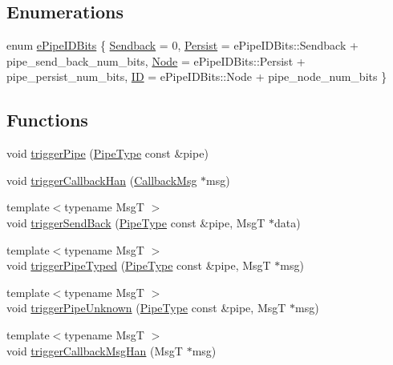 \subsection*{Enumerations}
\begin{DoxyCompactItemize}
\item 
enum \hyperlink{namespacevt_1_1pipe_a21eef17afd7b326e3b65894dffa25901}{e\+Pipe\+I\+D\+Bits} \{ \hyperlink{namespacevt_1_1pipe_a21eef17afd7b326e3b65894dffa25901aaac42b3fdd37e9218dbd0e436d89267d}{Sendback} = 0, 
\hyperlink{namespacevt_1_1pipe_a21eef17afd7b326e3b65894dffa25901ac18837aff5b91489fb6ecd1d654c9fe6}{Persist} = e\+Pipe\+I\+D\+Bits\+:\+:Sendback + pipe\+\_\+send\+\_\+back\+\_\+num\+\_\+bits, 
\hyperlink{namespacevt_1_1pipe_a21eef17afd7b326e3b65894dffa25901ac0c297204ed447f62890997c285e167f}{Node} = e\+Pipe\+I\+D\+Bits\+:\+:Persist + pipe\+\_\+persist\+\_\+num\+\_\+bits, 
\hyperlink{namespacevt_1_1pipe_a21eef17afd7b326e3b65894dffa25901af10f264d6f5a73d3ea0c79b74f383933}{ID} = e\+Pipe\+I\+D\+Bits\+:\+:Node + pipe\+\_\+node\+\_\+num\+\_\+bits
 \}
\end{DoxyCompactItemize}
\subsection*{Functions}
\begin{DoxyCompactItemize}
\item 
void \hyperlink{namespacevt_1_1pipe_ac55cd91c8aee610ae0e8b1843229a285}{trigger\+Pipe} (\hyperlink{namespacevt_ac9852acda74d1896f48f406cd72c7bd3}{Pipe\+Type} const \&pipe)
\item 
void \hyperlink{namespacevt_1_1pipe_af259c91e50470478594f47b11a8ecb88}{trigger\+Callback\+Han} (\hyperlink{structvt_1_1pipe_1_1_callback_msg}{Callback\+Msg} $\ast$msg)
\item 
{\footnotesize template$<$typename MsgT $>$ }\\void \hyperlink{namespacevt_1_1pipe_aa17c7b2572558dd48295d039f6f26c75}{trigger\+Send\+Back} (\hyperlink{namespacevt_ac9852acda74d1896f48f406cd72c7bd3}{Pipe\+Type} const \&pipe, MsgT $\ast$data)
\item 
{\footnotesize template$<$typename MsgT $>$ }\\void \hyperlink{namespacevt_1_1pipe_a1fea0e249e8f363c86cff32d9034238e}{trigger\+Pipe\+Typed} (\hyperlink{namespacevt_ac9852acda74d1896f48f406cd72c7bd3}{Pipe\+Type} const \&pipe, MsgT $\ast$msg)
\item 
{\footnotesize template$<$typename MsgT $>$ }\\void \hyperlink{namespacevt_1_1pipe_ae131e6afcc435107fcd51771caa9abc9}{trigger\+Pipe\+Unknown} (\hyperlink{namespacevt_ac9852acda74d1896f48f406cd72c7bd3}{Pipe\+Type} const \&pipe, MsgT $\ast$msg)
\item 
{\footnotesize template$<$typename MsgT $>$ }\\void \hyperlink{namespacevt_1_1pipe_a8be489288c5586b4a4d0daad173bc357}{trigger\+Callback\+Msg\+Han} (MsgT $\ast$msg)
\end{DoxyCompactItemize}


